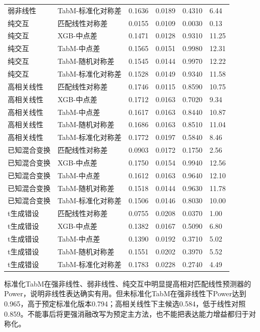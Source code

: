 \documentclass{sufethesismas}
\begin{document}
{\begin{longtable}[]{@{}llllll@{}}
弱非线性 & TabM-标准化对称差 & 0.1636 & 0.0189 & 0.4310 & 6.44 \\
纯交互 & 匹配线性对称差 & 0.0155 & 0.0109 & 0.0030 & 0.13 \\
纯交互 & XGB-中点差 & 0.1471 & 0.0128 & 0.9310 & 11.25 \\
纯交互 & TabM-中点差 & 0.1565 & 0.0151 & 0.9980 & 12.31 \\
纯交互 & TabM-随机对称差 & 0.1545 & 0.0144 & 0.9970 & 12.22 \\
纯交互 & TabM-标准化对称差 & 0.1528 & 0.0149 & 0.9340 & 11.58 \\
高相关线性 & 匹配线性对称差 & 0.1746 & 0.0115 & 0.8590 & 10.75 \\
高相关线性 & XGB-中点差 & 0.1712 & 0.0163 & 0.7020 & 9.34 \\
高相关线性 & TabM-中点差 & 0.1617 & 0.0163 & 0.8440 & 10.87 \\
高相关线性 & TabM-随机对称差 & 0.1686 & 0.0163 & 0.8510 & 11.04 \\
高相关线性 & TabM-标准化对称差 & 0.1772 & 0.0197 & 0.5840 & 8.46 \\
已知混合变换 & 匹配线性对称差 & 0.0903 & 0.0172 & 0.1750 & 2.56 \\
已知混合变换 & XGB-中点差 & 0.1750 & 0.0154 & 0.9940 & 12.56 \\
已知混合变换 & TabM-中点差 & 0.1612 & 0.0163 & 0.9640 & 12.10 \\
已知混合变换 & TabM-随机对称差 & 0.1518 & 0.0144 & 0.9630 & 11.78 \\
已知混合变换 & TabM-标准化对称差 & 0.1506 & 0.0146 & 0.8030 & 10.00 \\
t生成错设 & 匹配线性对称差 & 0.0755 & 0.0208 & 0.0370 & 1.00 \\
t生成错设 & XGB-中点差 & 0.1382 & 0.0167 & 0.5090 & 6.80 \\
t生成错设 & TabM-中点差 & 0.1390 & 0.0192 & 0.3710 & 5.02 \\
t生成错设 & TabM-随机对称差 & 0.1551 & 0.0202 & 0.3970 & 5.52 \\
t生成错设 & TabM-标准化对称差 & 0.1783 & 0.0228 & 0.2740 & 4.49 \\
\end{longtable}
}

标准化TabM在强非线性、弱非线性、纯交互中明显提高相对匹配线性预测器的Power，说明非线性表达确实有用。但未标准化TabM在强非线性下Power达到0.965，高于预定标准化版本0.794；高相关线性下主候选0.584，低于线性对照0.859。不能事后将更强消融改写为预定主方法，也不能把表达能力增益都归于对称化。
\end{document}
